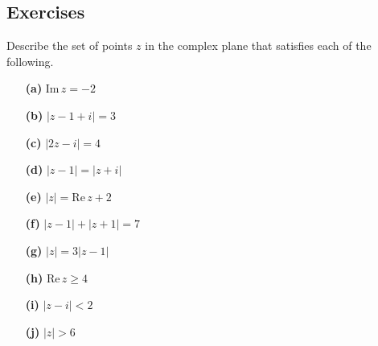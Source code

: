 \documentclass[
	12pt, %
	fleqn, %
	a4paper, %
]{LegrandOrangeBook}
\begin{document}
\subsection{Exercises}


\begin{exercise}
    Describe the set of points \( z \) in the complex plane that satisfies each of the following.
    \begin{enumerate}
        \item[\textbf{(a)}] \( \text{Im} \, z = -2 \)
        \item[\textbf{(b)}] \( |z - 1 + i| = 3 \)
        \item[\textbf{(c)}] \( |2z - i| = 4 \)
        \item[\textbf{(d)}] \( |z - 1| = |z + i| \)
        \item[\textbf{(e)}] \( |z| = \text{Re} \, z + 2 \)
        \item[\textbf{(f)}] \( |z - 1| + |z + 1| = 7 \)
        \item[\textbf{(g)}] \( |z| = 3|z - 1| \)
        \item[\textbf{(h)}] \( \text{Re} \, z \geq 4 \)
        \item[\textbf{(i)}] \( |z - i| < 2 \)
        \item[\textbf{(j)}] \( |z| > 6 \)
      \end{enumerate}
\end{exercise}
\end{document}
